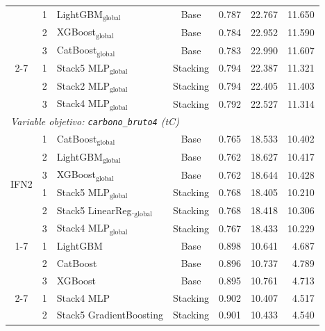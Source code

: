 \begin{table}[htbp]
\begin{tabular}{cclcrrr}
            & 1 & LightGBM$_{\text{global}}$             & Base     & 0.787 & 22.767 & 11.650 \\
            & 2 & XGBoost$_{\text{global}}$              & Base     & 0.784 & 22.952 & 11.590 \\
            & 3 & CatBoost$_{\text{global}}$             & Base     & 0.783 & 22.990 & 11.607 \\
        \cmidrule{2-7}
            & 1 & Stack5 MLP$_{\text{global}}$           & Stacking & 0.794 & 22.387 & 11.321 \\
            & 2 & Stack2 MLP$_{\text{global}}$           & Stacking & 0.794 & 22.405 & 11.403 \\
            & 3 & Stack4 MLP$_{\text{global}}$           & Stacking & 0.792 & 22.527 & 11.314 \\
        \midrule
        \multicolumn{7}{l}{\textit{Variable objetivo: \texttt{carbono\_bruto4} (tC)}} \\
        \midrule
        \multirow{6}{*}{IFN2}
            & 1 & CatBoost$_{\text{global}}$             & Base     & 0.765 & 18.533 & 10.402 \\
            & 2 & LightGBM$_{\text{global}}$             & Base     & 0.762 & 18.627 & 10.417 \\
            & 3 & XGBoost$_{\text{global}}$              & Base     & 0.762 & 18.644 & 10.428 \\
        \cmidrule{2-7}
            & 1 & Stack5 MLP$_{\text{global}}$           & Stacking & 0.768 & 18.405 & 10.210 \\
            & 2 & Stack5 LinearReg.$_{\text{global}}$      & Stacking & 0.768 & 18.418 & 10.306 \\
            & 3 & Stack4 MLP$_{\text{global}}$           & Stacking & 0.767 & 18.433 & 10.229 \\
        \cmidrule{1-7}
        \multirow{6}{*}{IFN3}
            & 1 & LightGBM                               & Base     & 0.898 & 10.641 &  4.687 \\
            & 2 & CatBoost                               & Base     & 0.896 & 10.737 &  4.789 \\
            & 3 & XGBoost                                & Base     & 0.895 & 10.761 &  4.713 \\
        \cmidrule{2-7}
            & 1 & Stack4 MLP                             & Stacking & 0.902 & 10.407 &  4.517 \\
            & 2 & Stack5 GradientBoosting                & Stacking & 0.901 & 10.433 &  4.540 \\

\end{tabular}
\end{table}
